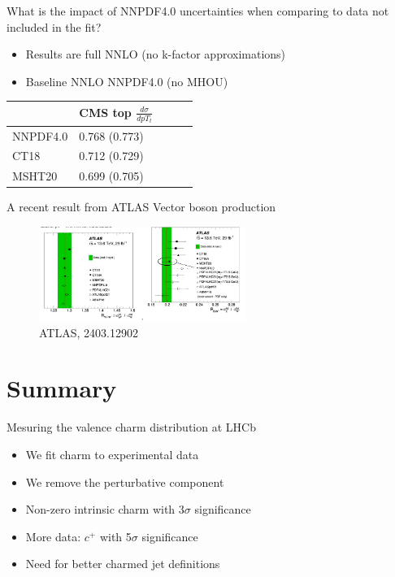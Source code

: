 \documentclass[aspectratio=43, 8pt,t]{beamer}
\begin{document}
\begin{frame}{What is the impact of NNPDF4.0 uncertainties when comparing to data not included in the fit?}
  \begin{itemize}
    \item Results are full NNLO (no k-factor approximations)
    \item Baseline NNLO NNPDF4.0 (no MHOU)
  \end{itemize}

  \begin{table}[]
    \begin{tabular}{@{}lllll@{}}
    \toprule
            & CMS top $\frac{d\sigma}{dpT_t}$ &  &  &  \\ \midrule
    NNPDF4.0 & 0.768 (0.773)                        &  &  &  \\
    CT18     & 0.712 (0.729)                        &  &  &  \\
    MSHT20   & 0.699 (0.705)                        &  &  &  \\ \bottomrule
    \end{tabular}
  \end{table}


\end{frame}

\begin{frame}{A recent result from ATLAS}
  Vector boson production
  \begin{figure}
    \includegraphics[width=0.6\textwidth]{atlas_vbf.png}
    \caption*{\color{gray}\footnotesize ATLAS, 2403.12902}
  \end{figure}
\end{frame}

\section{Summary}
\begin{frame}{Mesuring the valence charm distribution at LHCb}
  \begin{itemize}
    \item We fit charm to experimental data
    \item We remove the perturbative component
    \item Non-zero intrinsic charm with 3$\sigma$ significance
    \item More data: $c^+$ with 5$\sigma$ significance
    \item Need for better charmed jet definitions
  \end{itemize}

  \vspace*{5em}
\end{frame}
\end{document}
